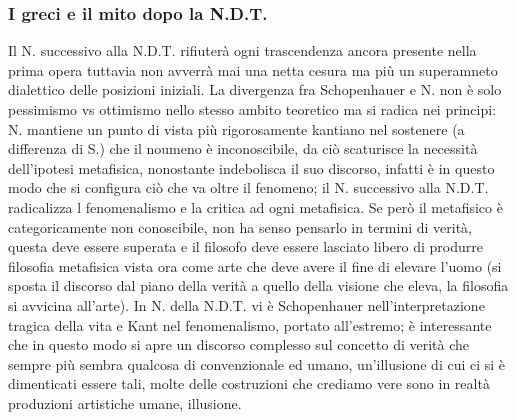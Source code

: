 \documentclass[10pt,a4paper]{article}
\begin{document}
\subsubsection{I greci e il mito dopo la N.D.T.}
Il N. successivo alla N.D.T. rifiuterà ogni trascendenza ancora presente nella prima opera tuttavia non avverrà mai una netta cesura ma più un superamneto dialettico delle posizioni iniziali.
La divergenza fra Schopenhauer e N. non è solo pessimismo vs ottimismo nello stesso ambito teoretico ma si radica nei principi: N. mantiene un punto di vista più rigorosamente kantiano nel sostenere (a differenza di S.) che il noumeno è inconoscibile, da ciò scaturisce la necessità dell'ipotesi metafisica, nonostante indebolisca il suo discorso, infatti è in questo modo che si configura ciò che va oltre il fenomeno; il N. successivo alla N.D.T. radicalizza l fenomenalismo e la critica ad ogni metafisica. Se però il metafisico è categoricamente non conoscibile, non ha senso pensarlo in termini di verità, questa deve essere superata e il filosofo deve essere lasciato libero di produrre filosofia metafisica vista ora come arte che deve avere il fine di elevare l'uomo (si sposta il discorso dal piano della verità a quello della visione che eleva, la filosofia si avvicina all'arte). In N. della N.D.T. vi è Schopenhauer nell'interpretazione tragica della vita e Kant nel fenomenalismo, portato all'estremo; è interessante che in questo modo si apre un discorso complesso sul concetto di verità che sempre più sembra qualcosa di convenzionale ed umano, un'illusione di cui ci si è dimenticati essere tali, molte delle costruzioni che crediamo vere sono in realtà produzioni artistiche umane, illusione.\\
\end{document}

